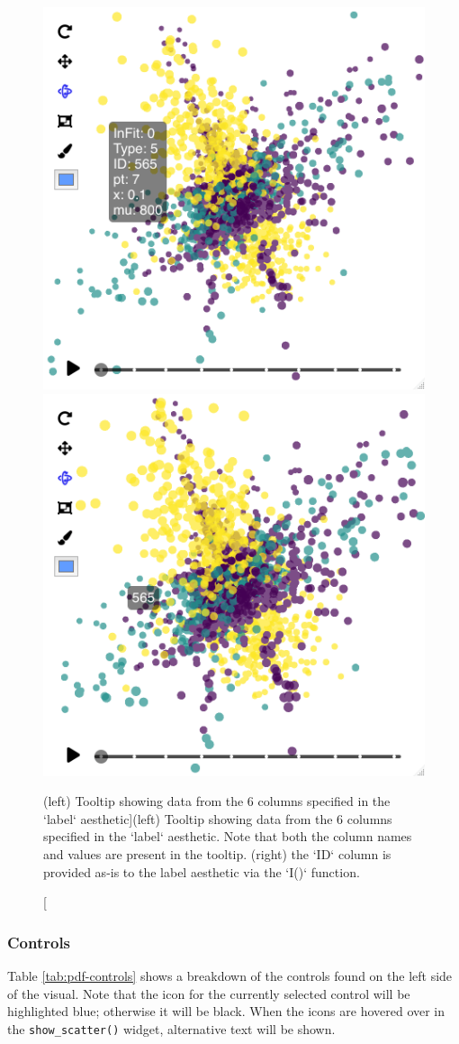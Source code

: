 \begin{Schunk}
\begin{figure}
\includegraphics[width=0.5\linewidth]{figures/implementation/hover_tooltip} \includegraphics[width=0.5\linewidth]{figures/implementation/hover_tooltip_asis} \caption[(left) Tooltip showing data from the 6 columns specified in the `label` aesthetic]{(left) Tooltip showing data from the 6 columns specified in the `label` aesthetic. Note that both the column names and values are present in the tooltip. (right) the `ID` column is provided as-is to the label aesthetic via the `I()` function.}\label{fig:hover-tooltip}
\end{figure}
\end{Schunk}

\hypertarget{controls}{%
\subsubsection{Controls}\label{controls}}

Table \ref{tab:pdf-controls} shows a breakdown of the controls found on
the left side of the visual. Note that the icon for the currently
selected control will be highlighted blue; otherwise it will be black.
When the icons are hovered over in the \texttt{show\_scatter()} widget,
alternative text will be shown.

